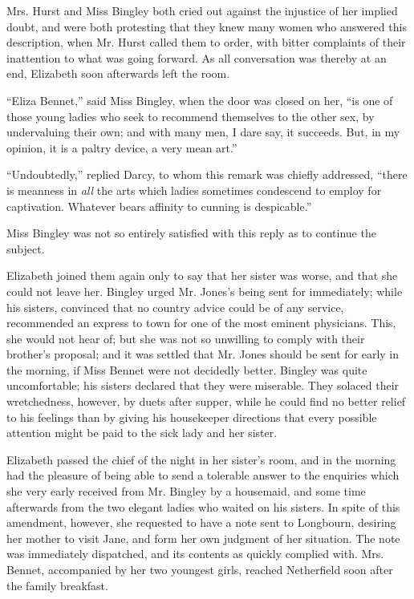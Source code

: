 Mrs. Hurst and Miss Bingley both cried out against the
injustice of her implied doubt, and were both protesting that
they knew many women who answered this description,
when Mr. Hurst called them to order, with bitter complaints
of their inattention to what was going forward. As all
conversation was thereby at an end, Elizabeth soon afterwards
left the room.

“Eliza Bennet,” said Miss Bingley, when the door was
closed on her, “is one of those young ladies who seek to
recommend themselves to the other sex, by undervaluing
their own; and with many men, I dare say, it succeeds.
But, in my opinion, it is a paltry device, a very mean art.”

“Undoubtedly,” replied Darcy, to whom this remark
was chiefly addressed, “there is meanness in \textit{all} the arts
which ladies sometimes condescend to employ for captivation.
Whatever bears affinity to cunning is despicable.”

Miss Bingley was not so entirely satisfied with this reply
as to continue the subject.

Elizabeth joined them again only to say that her sister
was worse, and that she could not leave her. Bingley
urged Mr. Jones’s being sent for immediately; while his
sisters, convinced that no country advice could be of any
service, recommended an express to town for one of the
most eminent physicians. This, she would not hear of;
but she was not so unwilling to comply with their brother’s
proposal; and it was settled that Mr. Jones should be
sent for early in the morning, if Miss Bennet were not
decidedly better. Bingley was quite uncomfortable; his
sisters declared that they were miserable. They solaced
their wretchedness, however, by duets after supper, while
he could find no better relief to his feelings than by giving
his housekeeper directions that every possible attention
might be paid to the sick lady and her sister.


Elizabeth passed the chief of the night in her sister’s
room, and in the morning had the pleasure of being able
to send a tolerable answer to the enquiries which she very
early received from Mr. Bingley by a housemaid, and some
time afterwards from the two elegant ladies who waited
on his sisters. In spite of this amendment, however, she
requested to have a note sent to Longbourn, desiring her
mother to visit Jane, and form her own judgment of her
situation. The note was immediately dispatched, and its
contents as quickly complied with. Mrs. Bennet, accompanied
by her two youngest girls, reached Netherfield soon
after the family breakfast.

